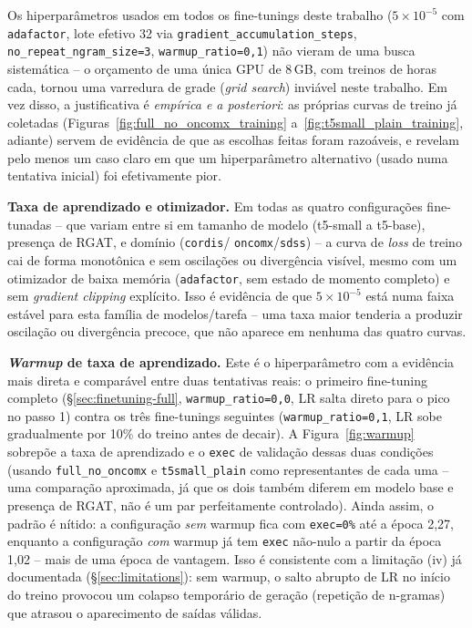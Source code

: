 Os hiperparâmetros usados em todos os fine-tunings deste trabalho
($5\times10^{-5}$ com \texttt{adafactor}, lote efetivo 32 via
\texttt{gradient\_accumulation\_steps}, \texttt{no\_repeat\_ngram\_size=3},
\texttt{warmup\_ratio=0,1}) não vieram de uma busca sistemática -- o
orçamento de uma única GPU de 8\,GB, com treinos de horas cada, tornou uma
varredura de grade (\emph{grid search}) inviável neste trabalho. Em vez
disso, a justificativa é \emph{empírica e a posteriori}: as próprias
curvas de treino já coletadas (Figuras~\ref{fig:full_no_oncomx_training}
a~\ref{fig:t5small_plain_training}, adiante) servem de evidência de que as
escolhas feitas foram razoáveis, e revelam pelo menos um caso claro em que
um hiperparâmetro alternativo (usado numa tentativa inicial) foi
efetivamente pior.

\textbf{Taxa de aprendizado e otimizador.} Em todas as quatro
configurações fine-tunadas -- que variam entre si em tamanho de modelo
(t5-small a t5-base), presença de RGAT, e domínio (\texttt{cordis}/
\texttt{oncomx}/\texttt{sdss}) -- a curva de \emph{loss} de treino cai de
forma monotônica e sem oscilações ou divergência visível, mesmo com um
otimizador de baixa memória (\texttt{adafactor}, sem estado de momento
completo) e sem \emph{gradient clipping} explícito. Isso é evidência de
que $5\times10^{-5}$ está numa faixa estável para esta família de
modelos/tarefa -- uma taxa maior tenderia a produzir oscilação ou
divergência precoce, que não aparece em nenhuma das quatro curvas.

\textbf{\emph{Warmup} de taxa de aprendizado.} Este é o hiperparâmetro com
a evidência mais direta e comparável entre duas tentativas reais: o
primeiro fine-tuning completo (\S\ref{sec:finetuning-full},
\texttt{warmup\_ratio=0,0}, LR salta direto para o pico no passo 1) contra
os três fine-tunings seguintes (\texttt{warmup\_ratio=0,1}, LR sobe
gradualmente por 10\% do treino antes de decair). A Figura~\ref{fig:warmup}
sobrepõe a taxa de aprendizado e o \texttt{exec} de validação dessas duas
condições (usando \texttt{full\_no\_oncomx} e \texttt{t5small\_plain} como
representantes de cada uma -- uma comparação aproximada, já que os dois
também diferem em modelo base e presença de RGAT, não é um par
perfeitamente controlado). Ainda assim, o padrão é nítido: a configuração
\emph{sem} warmup fica com \texttt{exec=0\%} até a época 2,27, enquanto a
configuração \emph{com} warmup já tem \texttt{exec} não-nulo a partir da
época 1,02 -- mais de uma época de vantagem. Isso é consistente com a
limitação (iv) já documentada (\S\ref{sec:limitations}): sem warmup, o
salto abrupto de LR no início do treino provocou um colapso temporário de
geração (repetição de n-gramas) que atrasou o aparecimento de saídas
válidas.

